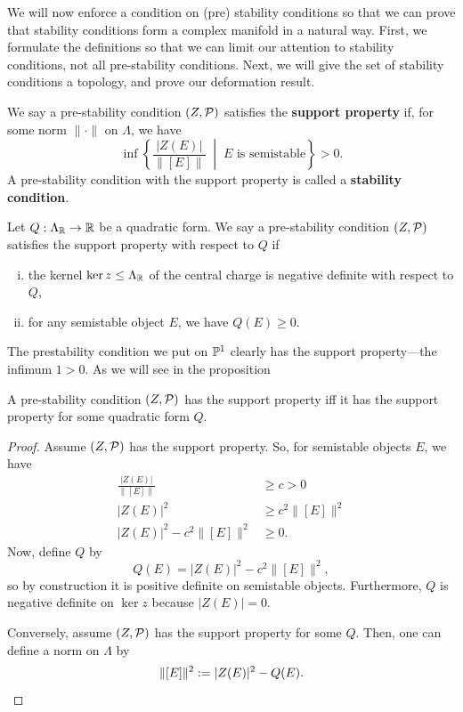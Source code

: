 \documentclass[12pt]{article}
\begin{document}
We will now enforce a condition on (pre) stability conditions so that we can prove that stability conditions form a complex manifold in a natural way. First, we formulate the definitions so that we can limit our attention to stability conditions, not all pre-stability conditions. Next, we will give the set of stability conditions a topology, and prove our deformation result.

\begin{defn}
    We say a pre-stability condition $(Z,\cP)$ satisfies the \textbf{support property} if, for some norm $\|\cdot\|$ on $\Lambda$, we have
    \[\inf \left\{\frac{|Z(E)|}{\|[E]\|} \;\middle|\; \text{$E$ is semistable} \right\}  > 0.\]
    A pre-stability condition with the support property is called a \textbf{stability condition}.
\end{defn}

\begin{defn}
    Let $Q: \Lambda_\R \to \R$ be a quadratic form. We say a pre-stability condition $(Z,\cP)$ satisfies the support property with respect to $Q$ if
    \begin{enumerate}[(i)]
        \item the kernel $\ker z \leq \Lambda_\R$ of the central charge is negative definite with respect to $Q$,
        \item for any semistable object $E$, we have $Q(E)\geq 0$.
    \end{enumerate}
\end{defn}

\begin{eg}
    The prestability condition we put on $\P^1$ clearly has the support property---the infimum $1>0$. As we will see in the proposition 
\end{eg}

\begin{prop}
    A pre-stability condition $(Z,\cP)$ has the support property iff it has the support property for some quadratic form $Q$.
\end{prop}

\begin{proof}
    Assume $(Z,\cP)$ has the support property. So, for semistable objects $E$, we have
    \begin{align*}
        \frac{|Z(E)|}{\|[E]\|} &\geq c > 0\\
        |Z(E)|^2 &\geq c^2\|[E]\|^2\\
        |Z(E)|^2 - c^2\|[E]\|^2 &\geq 0.
    \end{align*}
    Now, define $Q$ by
    \[Q(E) = |Z(E)|^2 - c^2\|[E]\|^2,\]
    so by construction it is positive definite on semistable objects. Furthermore, $Q$ is negative definite on $\ker z$ because $|Z(E)| = 0$.

    Conversely, assume $(Z,\cP)$ has the support property for some $Q$. Then, one can define a norm on $\Lambda$ by
    \[\|[E]\|^2 \defeq |Z(E)|^2 - Q(E).\]
\end{proof}
\end{document}
